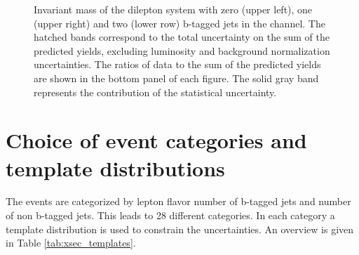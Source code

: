\begin{figure}[htbp!]
\begin{center}
      \caption{Invariant mass of the dilepton system with zero (upper left), one (upper right) and two (lower row) b-tagged 
      jets in the \emu channel. The hatched
        bands correspond to the total uncertainty on the sum of the
        predicted yields, excluding luminosity and background
        normalization uncertainties. 
        The ratios of data to the sum of the predicted yields are
        shown in the bottom panel of each figure. The solid gray band
        represents the contribution of the statistical uncertainty.}  
       \label{fig:xsec_ctrplots_mll}
  \end{center}
\end{figure}



\section{Choice of event categories and template distributions}
\label{sec:xsec_templates}

The events are categorized by lepton flavor number of b-tagged jets and number of non b-tagged jets. This leads to 28 different categories.
In each category a template distribution is used to constrain the uncertainties.
An overview is given in Table \ref{tab:xsec_templates}.

